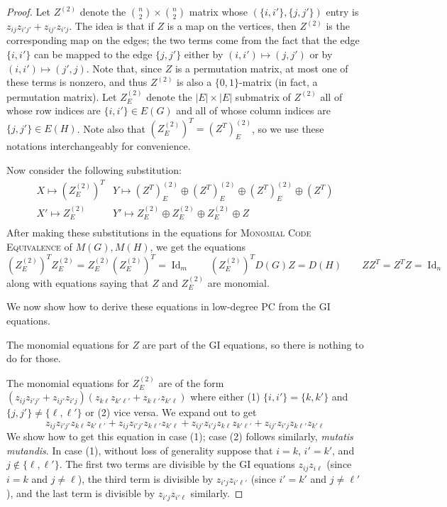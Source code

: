 \documentclass[10pt,a4paper]{article}
\theoremstyle{definition}
\DeclareMathOperator{\Id}{Id}
\begin{document}
\begin{proof}
Let $Z^{(2)}$ denote the $\binom{n}{2} \times \binom{n}{2}$ matrix whose $(\{i,i'\}, \{j,j'\})$ entry is $z_{ij} z_{i'j'} + z_{ij'} z_{i'j}$. The idea is that if $Z$ is a map on the vertices, then $Z^{(2)}$ is the corresponding map on the edges; the two terms come from the fact that the edge $\{i,i'\}$ can be mapped to the edge $\{j,j'\}$ either by $(i,i') \mapsto (j,j')$ or by $(i,i') \mapsto (j',j)$. Note that, since $Z$ is a permutation matrix, at most one of these terms is nonzero, and thus $Z^{(2)}$ is also a $\{0,1\}$-matrix (in fact, a permutation matrix). Let $Z^{(2)}_E$ denote the $|E| \times |E|$ submatrix of $Z^{(2)}$ all of whose row indices are $\{i,i'\} \in E(G)$ and all of whose column indices are $\{j,j'\} \in E(H)$. Note also that $(Z^{(2)}_E)^T = (Z^T)^{(2)}_E$, so we use these notations interchangeably for convenience.

Now consider the following substitution:
\[
\begin{array}{ll}
X \mapsto (Z^{(2)}_E)^T & Y \mapsto (Z^T)^{(2)}_E \oplus (Z^T)^{(2)}_E \oplus (Z^T)^{(2)}_E \oplus (Z^T)  \\
X' \mapsto Z^{(2)}_E & Y' \mapsto Z^{(2)}_E \oplus Z^{(2)}_E \oplus Z^{(2)}_E \oplus Z \\
\end{array}
\]
After making these substitutions in the equations for \textsc{Monomial Code Equivalence} of $M(G), M(H)$, we get the equations
\begin{equation} \label{eq:monGI}
(Z^{(2)}_E)^T Z^{(2)}_E = Z^{(2)}_E (Z^{(2)}_E)^T = \Id_m \qquad (Z^{(2)}_E)^T D(G) Z = D(H) \qquad ZZ^T = Z^T Z = \Id_n
\end{equation}
along with equations saying that $Z$ and $Z^{(2)}_E$ are monomial.

We now show how to derive these equations in low-degree PC from the \textsc{GI} equations. 

The monomial equations for $Z$ are part of the \textsc{GI} equations, so there is nothing to do for those.

The monomial equations for $Z^{(2)}_E$ are of the form $(z_{ij} z_{i'j'} + z_{ij'} z_{i'j})(z_{k\ell} z_{k'\ell'} + z_{k\ell'} z_{k'\ell})$ where either (1) $\{i,i'\} = \{k,k'\}$ and $\{j,j'\} \neq \{\ell,\ell'\}$ or (2) vice versa. We expand out to get 
\[
z_{ij} z_{i'j'} z_{k\ell} z_{k'\ell'} + z_{ij} z_{i'j'} z_{k\ell'} z_{k'\ell} + z_{ij'} z_{i'j}z_{k\ell} z_{k'\ell'} + z_{ij'} z_{i'j} z_{k\ell'} z_{k'\ell}
\]
We show how to get this equation in case (1); case (2) follows similarly, \emph{mutatis mutandis}. In case (1), without loss of generality suppose that $i=k$, $i'=k'$, and $j \notin \{\ell,\ell'\}$. The first two terms are divisible by the \textsc{GI} equations $z_{ij} z_{i \ell}$ (since $i=k$ and $j \neq \ell$), the third term is divisible by $z_{i'j} z_{i' \ell'}$ (since $i'=k'$ and $j \neq \ell'$), and the last term is divisible by $z_{i'j} z_{i' \ell}$ similarly.


\end{proof}
\end{document}
